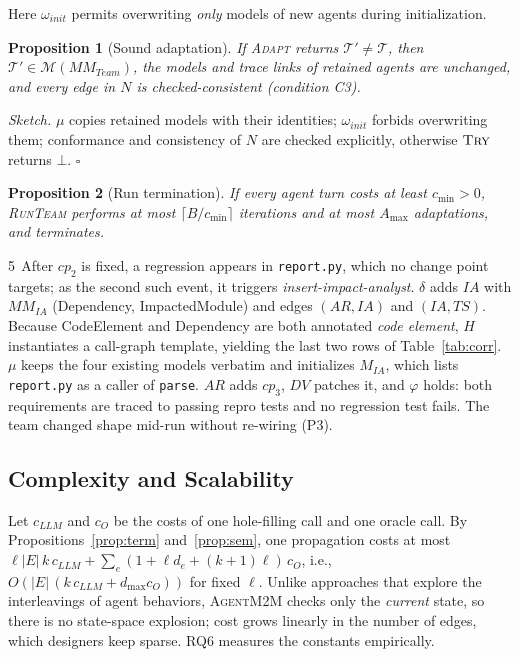 \documentclass[10pt, anonymous, conference]{IEEEtran}
\theoremstyle{definition}
\theoremstyle{plain}
\newtheorem{proposition}{Proposition}[section]
\theoremstyle{remark}
\newcommand{\tool}{\textsc{AgentM2M}}
\newcommand{\MM}{\mathit{MM}}
\newcommand{\Mods}[1]{\mathcal{M}(#1)}
\newcommand{\Team}{\mathit{Team}}
\newcommand{\team}{\mathcal{T}}
\newcommand{\cls}[1]{\textsf{#1}}
\newcommand{\code}[1]{\texttt{#1}}
\newcommand{\step}[1]{\textcircled{\scriptsize #1}}
\begin{document}
Here $\omega_{\mathit{init}}$ permits overwriting \emph{only} models of new
agents during initialization.

\begin{proposition}[Sound adaptation]\label{prop:adapt}
If \textsc{Adapt} returns $\team'\neq\team$, then $\team'\in
\Mods{\MM_{\Team}}$, the models and trace links of retained agents are
unchanged, and every edge in $N$ is checked-consistent (condition C3).
\end{proposition}
\noindent\emph{Sketch.} $\mu$ copies retained models with their identities;
$\omega_{\mathit{init}}$ forbids overwriting them; conformance and
consistency of $N$ are checked explicitly, otherwise $\textsc{Try}$ returns
$\bot$. \hfill$\square$

\begin{proposition}[Run termination]\label{prop:runterm}
If every agent turn costs at least $c_{\min}>0$, \textsc{RunTeam} performs at
most $\lceil B/c_{\min}\rceil$ iterations and at most $A_{\max}$ adaptations,
and terminates.
\end{proposition}

\smallskip\noindent\step{5}\,After $cp_2$ is fixed, a regression appears in
\code{report.py}, which no change point targets; as the second such event, it
triggers \emph{insert-impact-analyst}. $\delta$ adds $\mathit{IA}$ with
$\MM_{\mathit{IA}}$ (\cls{Dependency}, \cls{ImpactedModule}) and edges
$(\mathit{AR},\mathit{IA})$ and $(\mathit{IA},\mathit{TS})$. Because
\cls{CodeElement} and \cls{Dependency} are both annotated \emph{code element},
$H$ instantiates a call-graph template, yielding the last two rows of
Table~\ref{tab:corr}. $\mu$ keeps the four existing models verbatim and
initializes $M_{\mathit{IA}}$, which lists \code{report.py} as a caller of
\code{parse}. $\mathit{AR}$ adds $cp_3$, $\mathit{DV}$ patches it, and
$\varphi$ holds: both requirements are traced to passing repro tests and no
regression test fails. The team changed shape mid-run without re-wiring (P3).

\subsection{Complexity and Scalability}\label{subsec:complexity}
Let $c_{\mathit{LLM}}$ and $c_O$ be the costs of one hole-filling call and one
oracle call. By Propositions~\ref{prop:term} and~\ref{prop:sem}, one
propagation costs at most
$\ell|E|\,k\,c_{\mathit{LLM}}+\sum_e(1+\ell d_e+(k{+}1)\ell)\,c_O$, i.e.,
$O(|E|\,(k\,c_{\mathit{LLM}}+d_{\max}c_O))$ for fixed $\ell$. Unlike
approaches that explore the interleavings of agent
behaviors, \tool{} checks only the \emph{current} state, so there is no
state-space explosion; cost grows linearly in the number of edges, which
designers keep sparse. RQ6 measures the constants empirically.
\end{document}
